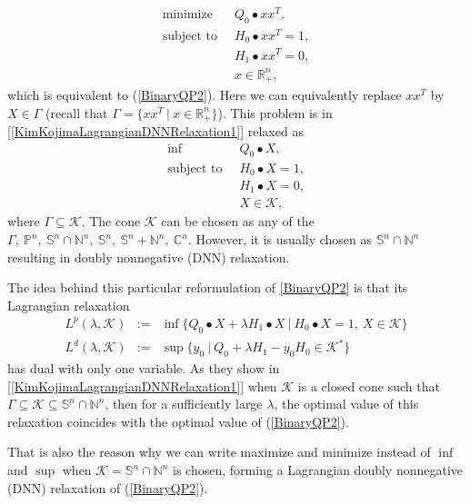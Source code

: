 \documentclass[12pt]{book}
\theoremstyle{definition}
\begin{document}
\begin{equation}
\label{BinaryQOP3}
\begin{array}{ll}
\mbox{minimize } 	& \ Q_0\bullet xx^T, \\
\mbox{subject to } 	& \ H_0\bullet xx^T = 1, \\
			& \ H_1\bullet xx^T = 0, \\
			& \ x\in\mathbb{R}^n_+,
\end{array}
\end{equation}
which is equivalent to (\ref{BinaryQP2}).  Here we can equivalently replace $xx^T$ by $X\in\Gamma$ (recall that $\Gamma = \{ xx^T \ \vert \ x\in\mathbb{R}^n_+ \}$). This problem is in [\ref{KimKojimaLagrangianDNNRelaxation1}] relaxed as 
\begin{equation}
\label{BinaryQOP3Relax}
\begin{array}{ll}
\mbox{inf } 	& \ Q_0\bullet X, \\ %
\mbox{subject to } 	& \ H_0\bullet X = 1, \\
			& \ H_1\bullet X = 0, \\
			& \ X\in\mathcal{K},
\end{array}
\end{equation}
where $\Gamma\subseteq\mathcal{K}$. The cone $\mathcal{K}$ can be chosen as any of the 
 $\Gamma, \ \mathbb{P}^n ,\ \mathbb{S}^n \cap \mathbb{N}^n , \ \mathbb{S}^n , \ \mathbb{S}^n + \mathbb{N}^n , \ \mathbb{C}^n. $ However, it is usually chosen as $\mathbb{S}^n \cap \mathbb{N}^n$ resulting in doubly nonnegative (DNN) relaxation.

The idea behind this particular reformulation of \ref{BinaryQP2} is that its Lagrangian relaxation 
\begin{eqnarray}
\label{LagrangianDNNPrimalDualPair1}
L^p(\lambda, \mathcal{K}) &:=& \inf \{ Q_0\bullet X + \lambda H_1\bullet X\ \vert \ H_0\bullet X = 1, \ X\in \mathcal{K} \} \\
\label{LagrangianDNNPrimalDualPair2}
L^d(\lambda, \mathcal{K}) &:=& \sup \{ y_0\ \vert \  Q_0 + \lambda H_1 - y_0H_0  \in \mathcal{K}^* \}
\end{eqnarray}
has dual with only one variable. 
As they show in [\ref{KimKojimaLagrangianDNNRelaxation1}] when $\mathcal{K}$ is a closed cone such that $\Gamma \subseteq \mathcal{K} \subseteq \mathbb{S}^n \cap \mathbb{N}^n$, then for a sufficiently large $\lambda$, the optimal value of this relaxation coincides with the optimal value of (\ref{BinaryQP2}).

That is also the reason why we can write maximize and minimize instead of $\inf$ and $\sup$ when 
$\mathcal{K} = \mathbb{S}^n \cap \mathbb{N}^n$ is chosen, forming a Lagrangian doubly nonnegative (DNN) relaxation of (\ref{BinaryQP2}).
\end{document}
